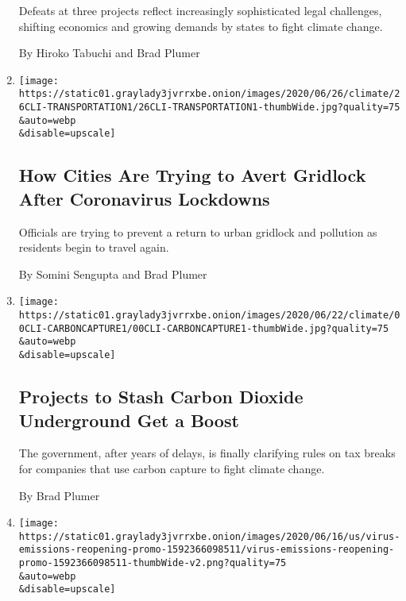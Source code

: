 \begin{enumerate}
  Defeats at three projects reflect increasingly sophisticated legal
  challenges, shifting economics and growing demands by states to fight
  climate change.

  By Hiroko Tabuchi and Brad Plumer
\item
  \href{/2020/06/26/climate/cities-cars-traffic-congestion.html}{}

  \texttt{[image: https://static01.graylady3jvrrxbe.onion/images/2020/06/26/climate/26CLI-TRANSPORTATION1/26CLI-TRANSPORTATION1-thumbWide.jpg?quality=75\\\&auto=webp\\\&disable=upscale]}

  \hypertarget{how-cities-are-trying-to-avert-gridlock-after-coronavirus-lockdowns}{%
  \subsection{How Cities Are Trying to Avert Gridlock After Coronavirus
  Lockdowns}\label{how-cities-are-trying-to-avert-gridlock-after-coronavirus-lockdowns}}

  Officials are trying to prevent a return to urban gridlock and
  pollution as residents begin to travel again.

  By Somini Sengupta and Brad Plumer
\item
  \href{/2020/06/24/climate/carbon-capture-tax-break.html}{}

  \texttt{[image: https://static01.graylady3jvrrxbe.onion/images/2020/06/22/climate/00CLI-CARBONCAPTURE1/00CLI-CARBONCAPTURE1-thumbWide.jpg?quality=75\\\&auto=webp\\\&disable=upscale]}

  \hypertarget{projects-to-stash-carbon-dioxide-underground-get-a-boost}{%
  \subsection{Projects to Stash Carbon Dioxide Underground Get a
  Boost}\label{projects-to-stash-carbon-dioxide-underground-get-a-boost}}

  The government, after years of delays, is finally clarifying rules on
  tax breaks for companies that use carbon capture to fight climate
  change.

  By Brad Plumer
\item
  \href{/interactive/2020/06/17/climate/virus-emissions-reopening.html}{}

  \texttt{[image: https://static01.graylady3jvrrxbe.onion/images/2020/06/16/us/virus-emissions-reopening-promo-1592366098511/virus-emissions-reopening-promo-1592366098511-thumbWide-v2.png?quality=75\\\&auto=webp\\\&disable=upscale]}


\end{enumerate}
